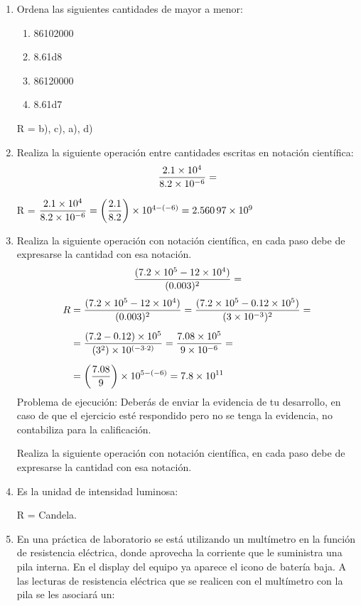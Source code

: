 \documentclass[14pt]{extarticle}
\begin{document}
\begin{enumerate}
\item Ordena las siguientes cantidades de mayor a menor:
\begin{enumerate}[label=\alph*)]
\item \num{86102000}
\item \num{8.61d8}
\item \num{86120000}
\item \num{8.61d7}
\end{enumerate}

R = b), c), a), d)

\item Realiza la siguiente operación entre cantidades escritas en notación científica:
\begin{align*}
\dfrac{\num{2.1d4}}{\num{8.2d-6}} =
\end{align*}

R = $\dfrac{\num{2.1d4}}{\num{8.2d-6}} = \left(\dfrac{2.1}{8.2} \right) \times 10^{4-(-6)} = \num{2.56097d9}$

\item Realiza la siguiente operación con notación científica, en cada paso debe de expresarse la cantidad con esa notación.
\begin{align*}
\dfrac{(\num{7.2d5} - \num{12d4})}{(0.003)^2} =
\end{align*}
\begin{align*}
R &= \dfrac{(\num{7.2d5} - \num{12d4})}{(0.003)^2} = \dfrac{(\num{7.2d5} - \num{0.12d5})}{(\num{3d-3})^2} = \\[0.5em]
&= \dfrac{(7.2 - 0.12) \times \num{d5}}{(3^2) \times 10^{(-3 \cdot 2)}} = \dfrac{\num{7.08d5}}{\num{9d-6}} = \\[0.5em]
&= \left( \dfrac{7.08}{9} \right) \times 10^{5-(-6)} = \num{7.8d11}
\end{align*}
Problema de ejecución: Deberás de enviar la evidencia de tu desarrollo, en caso de que el ejercicio esté respondido pero no se tenga la evidencia, no contabiliza para la calificación.

Realiza la siguiente operación con notación científica, en cada paso debe de expresarse la cantidad con esa notación.


\item Es la unidad de intensidad luminosa:

R = Candela.

\item En una práctica de laboratorio se está utilizando un multímetro en la función de resistencia eléctrica, donde aprovecha la corriente que le suministra una pila interna. En el display del equipo ya aparece el icono de batería baja. A las lecturas de resistencia eléctrica que se realicen con el multímetro con la pila se les asociará un:


\end{enumerate}
\end{document}
